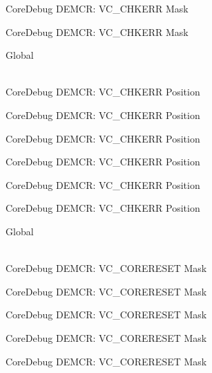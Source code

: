 \begin{DoxyRefList}
\label{deprecated__deprecated000515}%
%
Core\+Debug DEMCR\+: VC\+\_\+\+CHKERR Mask 

\label{deprecated__deprecated000617}%
%
Core\+Debug DEMCR\+: VC\+\_\+\+CHKERR Mask  
\item[{\parbox[t]{\linewidth}{Global \doxylink{group___c_m_s_i_s___core_debug_ga10fc7c53bca904c128bc8e1a03072d50}{Core\+Debug\+\_\+\+DEMCR\+\_\+\+VC\+\_\+\+CHKERR\+\_\+\+Pos} }}]\hfill \\
\label{deprecated__deprecated000063}%
%
Core\+Debug DEMCR\+: VC\+\_\+\+CHKERR Position 

\label{deprecated__deprecated000207}%
%
Core\+Debug DEMCR\+: VC\+\_\+\+CHKERR Position 

\label{deprecated__deprecated000349}%
%
Core\+Debug DEMCR\+: VC\+\_\+\+CHKERR Position 

\label{deprecated__deprecated000425}%
%
Core\+Debug DEMCR\+: VC\+\_\+\+CHKERR Position 

\label{deprecated__deprecated000514}%
%
Core\+Debug DEMCR\+: VC\+\_\+\+CHKERR Position 

\label{deprecated__deprecated000616}%
%
Core\+Debug DEMCR\+: VC\+\_\+\+CHKERR Position  
\item[{\parbox[t]{\linewidth}{Global \doxylink{group___c_m_s_i_s___core_debug_ga906476e53c1e1487c30f3a1181df9e30}{Core\+Debug\+\_\+\+DEMCR\+\_\+\+VC\+\_\+\+CORERESET\+\_\+\+Msk} }}]\hfill \\
\label{deprecated__deprecated000070}%
%
Core\+Debug DEMCR\+: VC\+\_\+\+CORERESET Mask 

\label{deprecated__deprecated000138}%
%
Core\+Debug DEMCR\+: VC\+\_\+\+CORERESET Mask 

\label{deprecated__deprecated000214}%
%
Core\+Debug DEMCR\+: VC\+\_\+\+CORERESET Mask 

\label{deprecated__deprecated000277}%
%
Core\+Debug DEMCR\+: VC\+\_\+\+CORERESET Mask 

\label{deprecated__deprecated000356}%
%
Core\+Debug DEMCR\+: VC\+\_\+\+CORERESET Mask 


\end{DoxyRefList}
